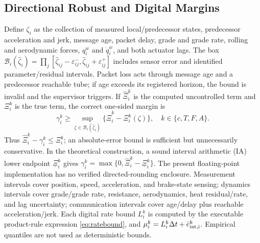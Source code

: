 \subsection{Directional Robust and Digital Margins}
Define $\zeta_i$ as the collection of measured local/predecessor states, predecessor acceleration and jerk, message age, packet delay, grade and grade rate, rolling and aerodynamic forces, $q_i^w$ and $\dot q_i^w$, and both actuator lags. The box $\mathcal B_i(\hat\zeta_i)=\prod_j[\hat\zeta_{ij}-\varepsilon_{ij}^-,\hat\zeta_{ij}+\varepsilon_{ij}^+]$ includes sensor error and identified parameter/residual intervals. Packet loss acts through message age and a predecessor reachable tube; if age exceeds its registered horizon, the bound is invalid and the supervisor triggers. If $\widehat\Xi_i^k$ is the computed uncontrolled term and $\Xi_i^k$ is the true term, the correct one-sided margin is
\begin{equation}\label{eq:margin}
\gamma_i^k\ge\sup_{\zeta\in\mathcal B_i(\hat\zeta_i)}
\{\widehat\Xi_i^k-\Xi_i^k(\zeta)\},\quad k\in\{c,T,F,A\}.
\end{equation}
Thus $\widehat\Xi_i^k-\gamma_i^k\le\Xi_i^k$; an absolute-error bound is sufficient but unnecessarily conservative. In the theoretical construction, a sound interval arithmetic (IA) lower endpoint $\underline\Xi_i^k$ gives $\gamma_i^k=\max\{0,\widehat\Xi_i^k-\underline\Xi_i^k\}$. The present floating-point implementation has no verified directed-rounding enclosure. Measurement intervals cover position, speed, acceleration, and brake-state sensing; dynamics intervals cover grade/grade rate, resistance, aerodynamics, heat residual/rate, and lag uncertainty; communication intervals cover age/delay plus reachable acceleration/jerk. Each digital rate bound $L_i^k$ is computed by the executable product-rule expression \eqref{eq:ratebound}, and $\mu_i^k=L_i^k\Delta t+\bar e_{\rm int,i}^k$. Empirical quantiles are not used as deterministic bounds.
